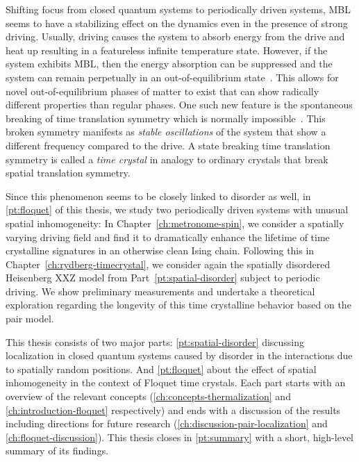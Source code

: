 Shifting focus from closed quantum systems to periodically driven systems, MBL seems to have a stabilizing effect on the dynamics even in the presence of strong driving. Usually, driving causes the system to absorb energy from the drive and heat up resulting in a featureless infinite temperature state. However, if the system exhibits MBL, then the energy absorption can be suppressed and the system can remain perpetually in an out-of-equilibrium state~\cite{abaninTheoryManybodyLocalization2016,elsePrethermalPhasesMatter2017,bordiaPeriodicallyDrivingManyBody2017,elseDiscreteTimeCrystals2020a}. This allows for novel out-of-equilibrium phases of matter to exist that can show radically different properties than regular phases. One such new feature is the spontaneous breaking of time translation symmetry which is normally impossible~\cite{watanabeAbsenceQuantumTime2015}. This broken symmetry manifests as \emph{stable oscillations} of the system that show a different frequency compared to the drive. A state breaking time translation symmetry is called a \emph{time crystal} in analogy to ordinary crystals that break spatial translation symmetry. 

Since this phenomenon seems to be closely linked to disorder as well, in \autoref{pt:floquet} of this thesis, we study two periodically driven systems with unusual spatial inhomogeneity: In Chapter~\ref{ch:metronome-spin}, we consider a spatially varying driving field and find it to dramatically enhance the lifetime of time crystalline signatures in an otherwise clean Ising chain. Following this in Chapter~\ref{ch:rydberg-timecrystal}, we consider again the spatially disordered Heisenberg XXZ model from Part~\ref{pt:spatial-disorder} subject to periodic driving. We show preliminary measurements and undertake a theoretical 
exploration regarding the longevity of this time crystalline behavior based on the pair model.

This thesis consists of two major parts: \autoref{pt:spatial-disorder} discussing localization in closed quantum systems caused by disorder in the interactions due to spatially random positions. And \autoref{pt:floquet} about the effect of spatial inhomogeneity in the context of Floquet time crystals.
Each part starts with an overview of the relevant concepts (\autoref{ch:concepts-thermalization} and \autoref{ch:introduction-floquet} respectively) and ends with a discussion of the results including directions for future research (\autoref{ch:discussion-pair-localization} and \autoref{ch:floquet-discussion}). This thesis closes in \autoref{pt:summary} with a short, high-level summary of its findings.

